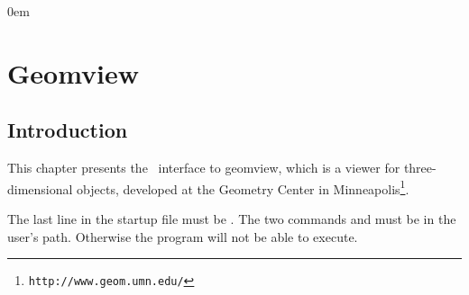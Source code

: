\newcommand{\Section}[1]{Section~{\protect\ref{#1}}}
\newcommand{\Chapter}[1]{Chapter~{\protect\ref{#1}}}
\newcommand{\new}[1]{\marginpar{\sf #1}}

\newcommand{\what}{\mbox{?\hspace*{2cm}?}}


\parindent0em
\setlength{\parskip}{1ex minus 0.9ex}
\sloppy

\newcommand{\note}[1]{{\bf NOTE: #1}}

\chapter{Geomview} \label{ChapterGeomview}


\section{Introduction}

This chapter presents the \cgal\ interface to geomview, which is a
viewer for three-dimensional objects, developed at the Geometry Center
in Minneapolis\footnote{\tt http://www.geom.umn.edu/}.

 The last line in the startup file 
must be . The two commands  and 
must be in the user's path. Otherwise the program will not be able to execute.

